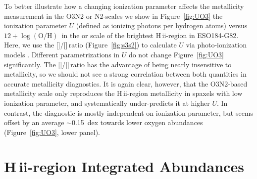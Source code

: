 \documentclass[traditabstract]{aa}
\newcommand{\hii}{\mbox{H\,{\sc ii}}}
\newcommand{\oh}{$12+\log(\mathrm{O/H})$}
\newcommand{\sii}{[\ion{S}{ii}]}
\newcommand{\siii}{[\ion{S}{iii}]}
\begin{document}
\begin{appendix}
To better illustrate how a changing ionization parameter affects the metallicity measurement in the O3N2 or N2-scales we show in Figure~\ref{fig:UO3} the ionization parameter $U$ (defined as ionizing photons per hydrogen atoms) versus \oh\, in the \citet{2004MNRAS.348L..59P} or \citet{2016Ap&SS.361...61D} scale of the brightest \hii-region in ESO184-G82. Here, we use the \sii/\siii\,ratio (Figure~\ref{fig:s3s2}) to calculate $U$ via photo-ionization models \citep{2011MNRAS.415.3616D}. Different parametrizations in $U$ \citep[e.g.][]{2016A&A...594A..37M} do not change Figure~\ref{fig:UO3} significantly. The \sii/\siii\,ratio has the advantage of being nearly insensitive to metallicity, so we should not see a strong correlation between both quantities in accurate metallicity diagnostics. It is again clear, however, that the O3N2-based metallicity scale only reproduces the \hii-region metallicity in spaxels with low ionization parameter, and systematically under-predicts it at higher $U$. In contrast, the \citet{2016Ap&SS.361...61D} diagnostic is mostly independent on ionization parameter, but seems offset by an average $\sim$0.15~dex towards lower oxygen abundances (Figure~\ref{fig:UO3}, lower panel).


\section{\hii-region Integrated Abundances}


\end{appendix}
\end{document}
